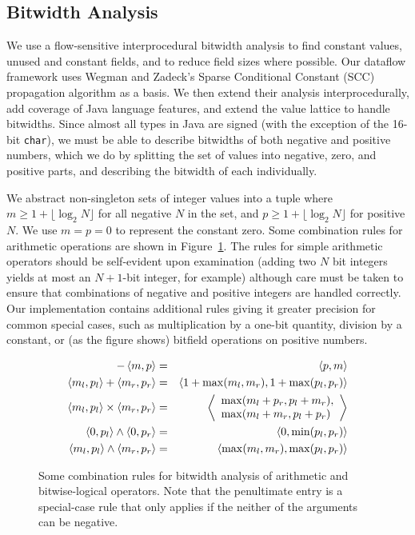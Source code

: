 \documentclass{acmconf}
\begin{document}
\subsection{Bitwidth Analysis}
We use a flow-sensitive interprocedural bitwidth analysis to
find constant values, unused and constant fields, and to reduce
field sizes where possible.  Our dataflow framework uses
Wegman and Zadeck's Sparse Conditional Constant (SCC) propagation
algorithm \cite{wegman91:scc} as a basis.  We then extend their
analysis interprocedurally, add coverage of Java language features,
and extend the value lattice to handle bitwidths.
Since almost all types in Java are signed (with the exception of the
16-bit {\tt char}), we must be able to describe bitwidths of both
negative and positive numbers, which we do by splitting the set of
values into negative, zero, and positive parts, and describing the
bitwidth of each individually.

We abstract non-singleton sets of integer values into a tuple
 where $m\ge 1+\lfloor\log_2 N\rfloor$ for all negative $N$
in the set, and $p\ge 1+\lfloor\log_2 N\rfloor$ for positive $N$.  We
use $m=p=0$ to represent the constant zero.
Some combination rules for arithmetic operations are
shown in Figure~\ref{fig:bitrules}.  The rules for simple arithmetic
operators should be self-evident upon examination (adding two $N$ bit
integers yields at most an $N+1$-bit integer, for example) although
care must be taken to ensure that combinations of negative and
positive integers are handled correctly.  Our implementation contains
additional rules giving it greater precision for common special cases,
such as multiplication by
a one-bit quantity, division by a constant, or (as the figure shows)
bitfield operations on positive numbers.
\begin{figure}[tp]
\begin{eqnarray*}
-\left\langle m,p \right\rangle &=& \left\langle p,m \right\rangle\\
\left\langle m_l,p_l \right\rangle + \left\langle m_r,p_r \right\rangle &=& \left\langle 1+\max(m_l,m_r),1+\max(p_l,p_r) \right\rangle\\
\left\langle m_l,p_l \right\rangle \times \left\langle m_r,p_r \right\rangle &=&
\left\langle \begin{array}{l}\max(m_l+p_r,p_l+m_r),\\
                       \max(m_l+m_r,p_l+p_r)\end{array} \right\rangle\\
\left\langle 0,p_l \right\rangle \wedge \left\langle 0,p_r \right\rangle &=& \left\langle 0,\min(p_l,p_r) \right\rangle\\
\left\langle m_l,p_l \right\rangle\wedge \left\langle m_r,p_r \right\rangle &=& \left\langle \max(m_l,m_r),\max(p_l,p_r) \right\rangle
\end{eqnarray*}%
\caption{Some combination rules for bitwidth analysis of arithmetic
  and bitwise-logical operators.
  Note that the penultimate entry is a
  special-case rule that only applies if the neither of the
  arguments can be negative.
}\label{fig:bitrules}
\end{figure}
\end{document}
